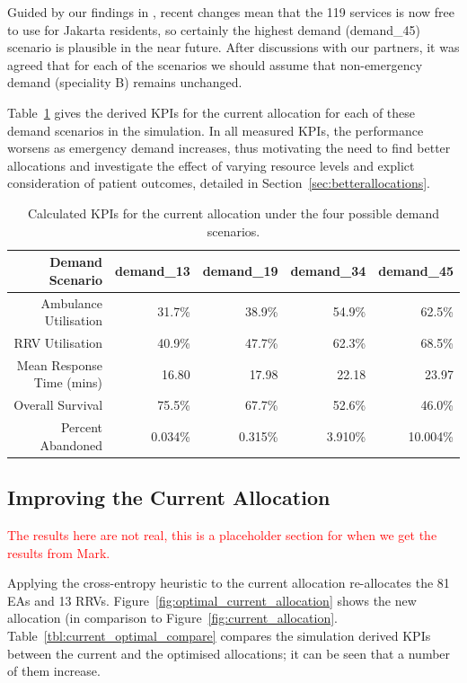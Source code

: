 \documentclass[preprint,12pt]{elsarticle}
\begin{document}
Guided by our findings in \cite{BriceSyaribahNoor2022Esui}, recent changes mean that the 119 services is now free to use for Jakarta residents, so certainly the highest demand (demand\_45) scenario is plausible in the near future.
After discussions with our partners, it was agreed that for each of the scenarios we should assume that non-emergency demand (speciality B) remains unchanged.  

Table~\ref{tbl:demand_results} gives the derived KPIs for the current allocation for each of these demand scenarios in the simulation. In all measured KPIs, the performance worsens as emergency demand increases, thus motivating the need to find better allocations and investigate the effect of varying resource levels and explict consideration of patient outcomes, detailed in Section~\ref{sec:betterallocations}.

\begin{table}
\begin{center}
\small
\begin{tabular}{rrrrr}
\toprule
Demand Scenario & \textbf{demand\_13} & \textbf{demand\_19} & \textbf{demand\_34} & \textbf{demand\_45} \\
\midrule
Ambulance Utilisation & 31.7\% & 38.9\% & 54.9\% & 62.5\% \\
RRV Utilisation & 40.9\% & 47.7\% & 62.3\% & 68.5\% \\
Mean Response Time (mins) & 16.80 & 17.98 & 22.18 & 23.97 \\
Overall Survival & 75.5\% & 67.7\% & 52.6\% & 46.0\% \\
Percent Abandoned & 0.034\% & 0.315\% & 3.910\% & 10.004\% \\
\bottomrule
\end{tabular}
\caption{Calculated KPIs for the current allocation under the four possible demand scenarios.}
\label{tbl:demand_results}
\end{center}
\end{table}

\subsection{Improving the Current Allocation}\label{sec:improve_current}
\textcolor{red}{The results here are not real, this is a placeholder section for when we get the results from Mark.}

Applying the cross-entropy heuristic to the current allocation re-allocates the 81 EAs and 13 RRVs. Figure~\ref{fig:optimal_current_allocation} shows the new allocation (in comparison to Figure~\ref{fig:current_allocation}. Table~\ref{tbl:current_optimal_compare} compares the simulation derived KPIs between the current and the optimised allocations; it can be seen that a number of them increase.
\end{document}
